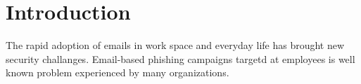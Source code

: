 

\pagestyle{plain} %
\setcounter{page}{1}
\chapter{Introduction}
The rapid adoption of emails in work space and everyday life has brought new security challanges. Email-based phishing campaigns targetd at employees is well known problem experienced by many organizations\cite{jampen_gür_sutter_tellenbach_2020}. 